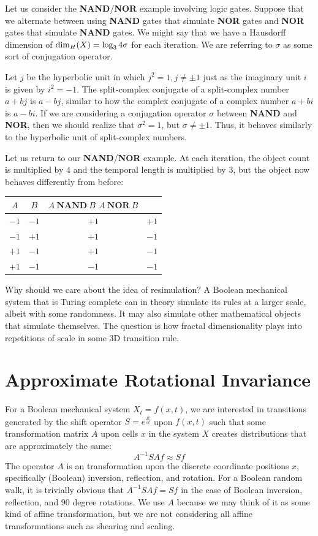 \documentclass[10pt, a5paper, twoside, openright]{memoir}
\begin{document}
Let us consider the \textbf{NAND}/\textbf{NOR} example involving logic gates. Suppose that we alternate between using \textbf{NAND} gates that simulate \textbf{NOR} gates and \textbf{NOR} gates that simulate \textbf{NAND} gates. We might say that we have a Hausdorff dimension of $\textnormal{dim}_H(X)= \log_3{4 \sigma}$ for each iteration. We are referring to $\sigma$ as some sort of conjugation operator.

Let $j$ be the hyperbolic unit in which $j^2 = 1, j \neq \pm 1$ just as the imaginary unit $i$ is given by $i^2 = -1$. The split-complex conjugate of a split-complex number $a+bj$ is $a-bj$, similar to how the complex conjugate of a complex number $a+bi$ is $a-bi$. If we are considering a conjugation operator $\sigma$ between \textbf{NAND} and \textbf{NOR}, then we should realize that $\sigma^2 = 1$, but $\sigma \neq \pm 1$. Thus, it behaves similarly to the hyperbolic unit of split-complex numbers.

Let us return to our \textbf{NAND}/\textbf{NOR} example. At each iteration, the object count is multiplied by $4$ and the temporal length is multiplied by $3$, but the object now behaves differently from before:
\begin{center}
\begin{tabular}{|c | c | c | c|}
\hline
$A$ & $B$ & $A \ \textbf{NAND} \ B$ $A \ \textbf{NOR} \ B$\\
\hline
$-1$ & $-1$ & $+1$ & $+1$\\
$-1$ & $+1$ & $+1$ & $-1$\\
$+1$ & $-1$ & $+1$ & $-1$\\
$+1$ & $-1$ & $-1$ & $-1$\\
\hline
\end{tabular}
\end{center}

Why should we care about the idea of resimulation? A Boolean mechanical system that is Turing complete can in theory simulate its rules at a larger scale, albeit with some randomness. It may also simulate other mathematical objects that simulate themselves. The question is how fractal dimensionality plays into repetitions of scale in some 3D transition rule.

\section{Approximate Rotational Invariance}
For a Boolean mechanical system $X_t = f(x,t)$, we are interested in transitions generated by the shift operator $S = e^{\frac{\partial}{\partial t}}$ upon $f(x,t)$ such that some transformation matrix $A$ upon cells $x$ in the system $X$ creates distributions that are approximately the same:
$$A^{-1} S A f \approx S f$$
The operator $A$ is an transformation upon the discrete coordinate positions $x$, specifically (Boolean) inversion, reflection, and rotation. For a Boolean random walk, it is trivially obvious that $A^{-1} S A f = S f$ in the case of Boolean inversion, reflection, and 90 degree rotations. We use $A$ because we may think of it as some kind of affine transformation, but we are not considering all affine transformations such as shearing and scaling.
\end{document}
